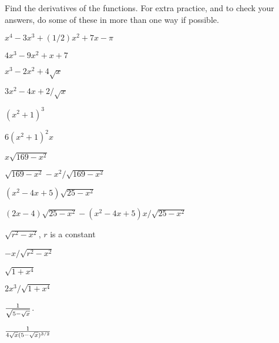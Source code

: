 \begin{exercises}

Find the derivatives of the functions. For extra practice, and to
check your answers, do some of these in more than one way if
possible. 

\twocol

\begin{exercise} $x^4-3x^3+(1/2)x^2+7x-\pi$
\begin{answer} $4x^3-9x^2+x+7$
\end{answer}\end{exercise}

\begin{exercise} $x^3-2x^2+4\sqrt{x}$
\begin{answer} $3x^2-4x+2/\sqrt{x}$
\end{answer}\end{exercise}

\begin{exercise} $(x^2+1)^3$
\begin{answer} $6(x^2+1)^2x$
\end{answer}\end{exercise}

\begin{exercise} $x\sqrt{169-x^2}$
\begin{answer} $\sqrt{169-x^2}-x^2/\sqrt{169-x^2}$
\end{answer}\end{exercise}

\begin{exercise} $(x^2-4x+5)\sqrt{25-x^2}$
\begin{answer} $ (2x-4)\sqrt{25-x^2}-$\hfill\break$(x^2-4x+5)x/\sqrt{25-x^2}$
\end{answer}\end{exercise}

\begin{exercise} $\sqrt{r^2-x^2}$, $r$ is a constant
\begin{answer} $-x/\sqrt{r^2-x^2}$
\end{answer}\end{exercise}

\begin{exercise} $\sqrt{1+x^4}$
\begin{answer} $2x^3/\sqrt{1+x^4}$
\end{answer}\end{exercise}

\begin{exercise} ${1\over\sqrt{5-\sqrt{x}}}$.
\begin{answer} ${1\over 4\sqrt{x}(5-\sqrt{x})^{3/2}}$
\end{answer}\end{exercise}


\end{exercises}
